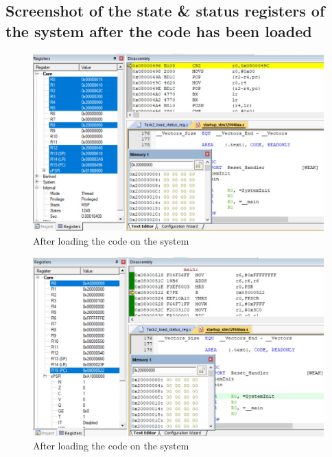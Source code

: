 \documentclass[footheight=20pt, footsepline, headheight=20pt, headsepline]{scrartcl}
\begin{document}
\subsection*{Screenshot of the state \& status registers of the system after the code has been loaded}
\begin{figure}[ht]
    \centering
    \includegraphics[scale=.7]{images/Task2_Before1.jpg}
    \caption{After loading the code on the system}
    \label{fig:before_task_3a}
\end{figure}
\FloatBarrier
\begin{figure}[ht]
    \centering
    \includegraphics[scale=.7]{images/Task2_Before2.jpg}
    \caption{After loading the code on the system}
    \label{fig:before_task_3a}
\end{figure}
\FloatBarrier
\end{document}

